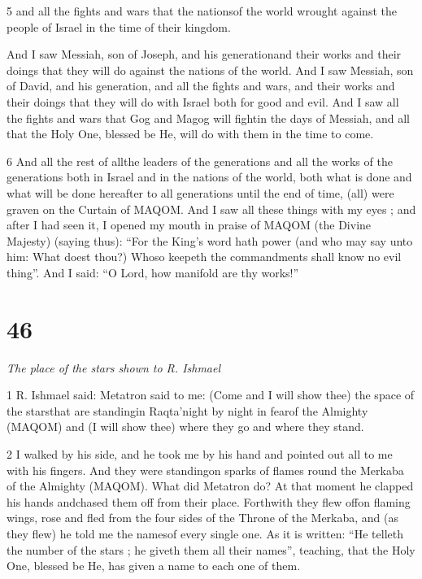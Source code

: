 \par 5 and all the fights and wars that the nationsof the world wrought against the people of Israel in the time of their kingdom. 

\par And I saw Messiah, son of Joseph, and his generationand their works and their doings that they will do against the nations of the world. And I saw Messiah, son of David, and his generation, and all the fights and wars, and their works and their doings that they will do with Israel both for good and evil. And I saw all the fights and wars that Gog and Magog will fightin the days of Messiah, and all that the Holy One, blessed be He, will do with them in the time to come. 

\par 6 And all the rest of allthe leaders of the generations and all the works of the generations both in Israel and in the nations of the world, both what is done and what will be done hereafter to all generations until the end of time, (all) were graven on the Curtain of MAQOM. And I saw all these things with my eyes ; and after I had seen it, I opened my mouth in praise of MAQOM (the Divine Majesty) (saying thus): “For the King's word hath power (and who may say unto him: What doest thou?) Whoso keepeth the commandments shall know no evil thing”. And I said: “O Lord, how manifold are thy works!” 



\chapter{46}

\par \textit{The place of the stars shown to R. Ishmael}

\par 1 R. Ishmael said: Metatron said to me: (Come and I will show thee) the space of the starsthat are standingin Raqta'night by night in fearof the Almighty (MAQOM) and (I will show thee) where they go and where they stand. 

\par 2 I walked by his side, and he took me by his hand and pointed out all to me with his fingers. And they were standingon sparks of flames round the Merkaba of the Almighty (MAQOM). What did Metatron do? At that moment he clapped his hands andchased them off from their place. Forthwith they flew offon flaming wings, rose and fled from the four sides of the Throne of the Merkaba, and (as they flew) he told me the namesof every single one. As it is written: “He telleth the number of the stars ; he giveth them all their names”, teaching, that the Holy One, blessed be He, has given a name to each one of them. 

